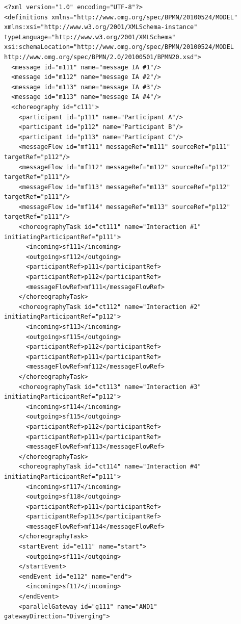 \begin{lstlisting}[caption={BPMN Choreography Model Example},captionpos=b, label={lst:choreobpmnex}]
<?xml version="1.0" encoding="UTF-8"?>
<definitions xmlns="http://www.omg.org/spec/BPMN/20100524/MODEL" xmlns:xsi="http://www.w3.org/2001/XMLSchema-instance" typeLanguage="http://www.w3.org/2001/XMLSchema" xsi:schemaLocation="http://www.omg.org/spec/BPMN/20100524/MODEL http://www.omg.org/spec/BPMN/2.0/20100501/BPMN20.xsd"> 
  <message id="m111" name="message IA #1"/>
  <message id="m112" name="message IA #2"/>
  <message id="m113" name="message IA #3"/>
  <message id="m113" name="message IA #4"/>
  <choreography id="c111">
    <participant id="p111" name="Participant A"/>
    <participant id="p112" name="Participant B"/>
    <participant id="p113" name="Participant C"/>
    <messageFlow id="mf111" messageRef="m111" sourceRef="p111" targetRef="p112"/>
    <messageFlow id="mf112" messageRef="m112" sourceRef="p112" targetRef="p111"/>
    <messageFlow id="mf113" messageRef="m113" sourceRef="p112" targetRef="p111"/>
    <messageFlow id="mf114" messageRef="m113" sourceRef="p112" targetRef="p111"/>
    <choreographyTask id="ct111" name="Interaction #1" initiatingParticipantRef="p111">
      <incoming>sf111</incoming>
      <outgoing>sf112</outgoing>
      <participantRef>p111</participantRef>
      <participantRef>p112</participantRef>
      <messageFlowRef>mf111</messageFlowRef>
    </choreographyTask>
    <choreographyTask id="ct112" name="Interaction #2" initiatingParticipantRef="p112">
      <incoming>sf113</incoming>
      <outgoing>sf115</outgoing>
      <participantRef>p112</participantRef>
      <participantRef>p111</participantRef>
      <messageFlowRef>mf112</messageFlowRef>
    </choreographyTask>
    <choreographyTask id="ct113" name="Interaction #3" initiatingParticipantRef="p112">
      <incoming>sf114</incoming>
      <outgoing>sf115</outgoing>
      <participantRef>p112</participantRef>
      <participantRef>p111</participantRef>
      <messageFlowRef>mf113</messageFlowRef>
    </choreographyTask>
    <choreographyTask id="ct114" name="Interaction #4" initiatingParticipantRef="p111">
      <incoming>sf117</incoming>
      <outgoing>sf118</outgoing>
      <participantRef>p111</participantRef>
      <participantRef>p113</participantRef>
      <messageFlowRef>mf114</messageFlowRef>
    </choreographyTask>
    <startEvent id="e111" name="start">
      <outgoing>sf111</outgoing>
    </startEvent>
    <endEvent id="e112" name="end">
      <incoming>sf117</incoming>
    </endEvent>
    <parallelGateway id="g111" name="AND1" gatewayDirection="Diverging">

\end{lstlisting}
